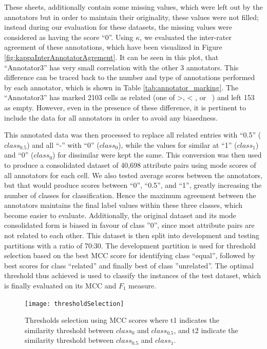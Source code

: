 \documentclass{ieeeaccess}
\begin{document}
These sheets, additionally contain some missing values, which were left out by the annotators but in order to maintain their originality, these values were not filled; instead during our evaluation for these datasets, the missing values were considered as having the score ``0''. Using $\kappa$, we evaluated the inter-rater agreement of these annotations, which have been visualized in Figure \ref{fig:kappaInterAnnotatorAgrement}. It can be seen in this plot, that ``Annotator3'' has very small correlation with the other 3 annotators. This difference can be traced back to the number and type of annotations performed by each annotator, which is shown in Table \ref{tab:annotator_marking}. The ``Annotator3'' has marked 2103 cells as related (one of >, < , or ~) and left 153 as empty. However, even in the presence of these difference, it is pertinent to include the data for all annotators in order to avoid any biasedness. 

This annotated data was then processed to replace all related entries with ``0.5'' ($class_{0.5}$) and all ``-'' with ``0'' ($class_{0}$), while the values for similar at ``1'' ($class_{1}$) and ``0'' ($class_{0}$) for dissimilar were kept the same. This conversion was then used to produce a consolidated dataset of 40,698 attribute pairs using mode scores of all annotators for each cell. We also tested average scores between the annotators, but that would produce scores between ``0'', ``0.5'', and ``1'', greatly increasing the number of classes for classification. Hence the maximum agreement between the annotators maintains the final label values within these three classes, which become easier to evaluate. Additionally, the original dataset and its mode consolidated form is biased in favour of class ''0'', since most attribute pairs are not related to each other.
This dataset is then split into development and testing partitions with a ratio of 70:30. The development partition is used for threshold selection based on the best MCC score for identifying class ``equal'', followed by best scores for class ``related'' and finally best of class ''unrelated''. The optimal threshold thus achieved is used to classify the instances of the test dataset, which is finally evaluated on its MCC and $F_1$ measure.

\begin{figure}[t!]
	\centering
	\texttt{[image: thresholdSelection]}
	\caption{Thresholds selection using MCC scores where t1 indicates the similarity threshold between $class_0$ and $class_{0.5}$, and t2 indicate the similarity threshold between $class_{0.5}$ and $class_1$.}
	\label{fig:thresholdSelection}
\end{figure}
\end{document}
